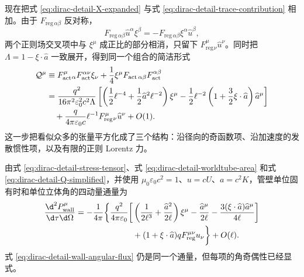现在把式 \eqref{eq:dirac-detail-X-expanded} 与式 \eqref{eq:dirac-detail-trace-contribution} 相加。由于 $F_{\mathrm{reg}\,\alpha\beta}$ 反对称，
\begin{equation*}
 F_{\mathrm{reg}\,\alpha\beta}\widehat u^\alpha\xi^\beta
 =-F_{\mathrm{reg}\,\alpha\beta}\xi^\alpha \widehat u^\beta,
\end{equation*}
两个正则场交叉项中与 $\xi^\mu$ 成正比的部分相消，只留下 $F_{\mathrm{reg}}^\mu{}_{\nu}\widehat u^\nu$。同时把 $\Lambda=1-\xi\cdot \widehat a$ 一致展开，得到同一个组合的简洁形式
\begin{align}
 \mathcal Q^\mu
 &\equiv
 F_{\mathrm{act}}^\mu{}_{\alpha}
 F_{\mathrm{act}}^{\alpha\nu}\xi_\nu
 +{1\over4}\xi^\mu
 F_{\mathrm{act}\,\alpha\beta}F_{\mathrm{act}}^{\alpha\beta}
 \notag\\
 &={q^2\over16\pi^2\varepsilon_0^2c^2\Lambda}
 \left[
 \left({1\over2}\ell^{-4}
 +{1\over2}\widehat a^2\ell^{-2}\right)\xi^\mu
 -{1\over2}\ell^{-2}
 \left(1+{3\over2}\xi\cdot \widehat a\right)\widehat a^\mu
 \right]
 \notag\\
 &\quad
 +{q\over4\pi\varepsilon_0c}\ell^{-1}
 F_{\mathrm{reg}}^\mu{}_{\nu}\widehat u^\nu+O(1).
 \label{eq:dirac-detail-Q-simplified}
\end{align}
这一步把看似众多的张量平方化成了三个结构：沿径向的奇函数项、沿加速度的发散惯性项，以及有限的正则 Lorentz 力。

由式 \eqref{eq:dirac-detail-stress-tensor}、式 \eqref{eq:dirac-detail-worldtube-area} 和式 \eqref{eq:dirac-detail-Q-simplified}，并使用 $\mu_0\varepsilon_0c^2=1$、$u=cU$、$a=c^2K$，管壁单位固有时和单位立体角的四动量通量为
\begin{align}
 {\d^2P_{\mathrm{wall}}^\mu\over\d\tau\d\Omega}
 =-{1\over4\pi}\bigg\{ {q^2\over4\pi\varepsilon_0}
 \bigg[{}
 &\left({1\over2\ell^3}
 +{\widehat a^2\over2\ell}\right)\xi^\mu
 -{\widehat a^\mu\over2\ell}
 -{3(\xi\cdot \widehat a)\widehat a^\mu\over4\ell}
 \bigg]
 \notag\\
 &+(1+\xi\cdot \widehat a)
 qF_{\mathrm{reg}}^{\mu\nu}u_\nu
 \bigg\}+O(\ell).
 \label{eq:dirac-detail-wall-angular-flux}
\end{align}
式 \eqref{eq:dirac-detail-wall-angular-flux} 仍是同一个通量，但每项的角奇偶性已经显式。

